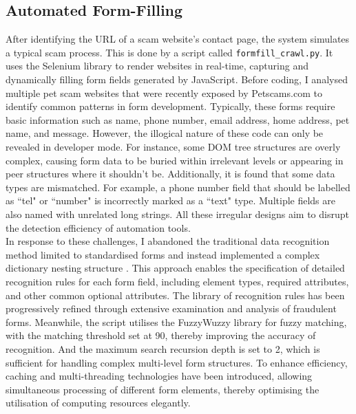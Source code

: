 \documentclass[ oneside,%
                    author={Cassie Qing Tang},
                    degree={BSc},
                     title={An Automated Response System for Disrupting Online Pet Scamming \\ },
                    subtitle={ }]{dissertation}
\begin{document}
\subsection{Automated Form-Filling}
After identifying the URL of a scam website's contact page, the system simulates a typical scam process. This is done by a script called \texttt{formfill\_crawl.py}. It uses the Selenium library to render websites in real-time, capturing and dynamically filling form fields generated by JavaScript. Before coding, I analysed multiple pet scam websites that were recently exposed by Petscams.com to identify common patterns in form development. Typically, these forms require basic information such as name, phone number, email address, home address, pet name, and message. However, the illogical nature of these code can only be revealed in developer mode. For instance, some DOM tree structures are overly complex, causing form data to be buried within irrelevant levels or appearing in peer structures where it shouldn't be. Additionally, it is found that some data types are mismatched. For example, a phone number field that should be labelled as ``tel" or ``number" is incorrectly marked as a ``text" type. Multiple fields are also named with unrelated long strings. All these irregular designs aim to disrupt the detection efficiency of automation tools.
\\

In response to these challenges, I abandoned the traditional data recognition method limited to standardised forms and instead implemented a complex dictionary nesting structure \cite{noauthor_python_2023}. This approach enables the specification of detailed recognition rules for each form field, including element types, required attributes, and other common optional attributes. The library of recognition rules has been progressively refined through extensive examination and analysis of fraudulent forms. Meanwhile, the script utilises the FuzzyWuzzy library for fuzzy matching, with the matching threshold set at 90, thereby improving the accuracy of recognition. And the maximum search recursion depth is set to 2, which is sufficient for handling complex multi-level form structures. To enhance efficiency, caching and multi-threading technologies have been introduced, allowing simultaneous processing of different form elements, thereby optimising the utilisation of computing resources elegantly.
\\
\end{document}
